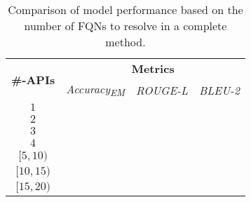 \begin{table}[]
\centering
\begin{tabular}{l|ccc}
\toprule
\multirow{2}{*}{\textbf{\#-APIs}} & \multicolumn{3}{c}{\textbf{Metrics}}                                  \\ \cline{2-4} 
                                   & \multicolumn{1}{c|}{\textit{Accuracy\textsubscript{EM}}} & \multicolumn{1}{c|}{\textit{ROUGE-L}} & \textit{BLEU-2} \\ \hline
\multicolumn{1}{c|}{$1$}      & \multicolumn{1}{c|}{}         & \multicolumn{1}{c|}{}        &   \\
\multicolumn{1}{c|}{$2$}      & \multicolumn{1}{c|}{}         & \multicolumn{1}{c|}{}        &   \\ 
\multicolumn{1}{c|}{$3$}      & \multicolumn{1}{c|}{}         & \multicolumn{1}{c|}{}        &   \\ 
\multicolumn{1}{c|}{$4$}      & \multicolumn{1}{c|}{}         & \multicolumn{1}{c|}{}        &   \\ 
\multicolumn{1}{c|}{$[5, 10)$}      & \multicolumn{1}{c|}{}         & \multicolumn{1}{c|}{}        &   \\ 
\multicolumn{1}{c|}{$[10, 15)$}      & \multicolumn{1}{c|}{}         & \multicolumn{1}{c|}{}        &   \\ 
\multicolumn{1}{c|}{$[15, 20)$}      & \multicolumn{1}{c|}{}         & \multicolumn{1}{c|}{}        &   \\ \bottomrule
\end{tabular}
\caption{Comparison of model performance based on the number of FQNs to resolve in a complete method.}
\label{tab:ablation}
\end{table}